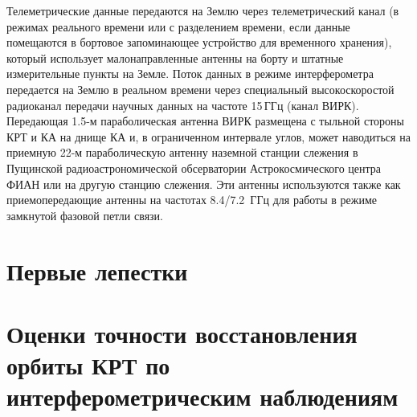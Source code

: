 Телеметрические данные передаются на Землю
через телеметрический канал (в режимах реального
времени или с разделением времени, если данные
помещаются в бортовое запоминающее устройство
для временного хранения), который использует
малонаправленные антенны на борту и штатные
измерительные пункты на Земле. Поток данных
в режиме интерферометра передается на Землю
в реальном времени через специальный высокоскоростой радиоканал передачи научных данных
на частоте 15\,ГГц (канал ВИРК). Передающая
1.5-м параболическая антенна ВИРК размещена
с тыльной стороны КРТ и КА на днище КА и, в
ограниченном интервале углов, может наводиться
на приемную 22-м параболическую антенну наземной станции слежения в Пущинской радиоастрономической
обсерватории Астрокосмического центра ФИАН или на другую станцию слежения.
Эти антенны используются также как приемопередающие антенны на частотах 8.4/7.2~ГГц для
работы в режиме замкнутой фазовой петли связи.



\section{Первые лепестки}

\section{Оценки точности восстановления орбиты КРТ по интерферометрическим наблюдениям}
